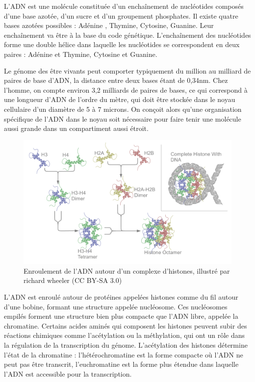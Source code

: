 L'ADN est une molécule constituée d'un enchaînement de nucléotides composés d'une base azotée, d'un sucre et d'un groupement phosphates. Il existe quatre bases azotées possibles : Adénine , Thymine, Cytosine, Guanine. Leur enchaînement va être à la base du code génétique.
L'enchaînement des nucléotides forme une double hélice dans laquelle les nucléotides se correspondent en deux paires : Adénine et Thymine, Cytosine et Guanine. 

Le génome des être vivants peut comporter typiquement du million au milliard de paires de base d'ADN, la distance entre deux bases étant de 0,34nm. Chez l'homme, on compte environ 3,2 milliards de paires de bases, ce qui correspond à une longueur d'ADN de l'ordre du mètre, qui doit être stockée dans le noyau cellulaire d'un diamètre de 5 à 7 microns. 
On conçoit alors qu'une organisation spécifique de l'ADN dans le noyau soit nécessaire pour faire tenir une molécule aussi grande dans un compartiment aussi étroit. 

\begin{figure}[h!]
\includegraphics[scale=0.3]{Nucleosome_structure_by_richard_wheeler}
\caption{Enroulement de l'ADN autour d'un complexe d'histones, illustré par richard wheeler (CC BY-SA 3.0)}
\end{figure}

L'ADN est enroulé autour de protéines appelées histones comme du fil autour d'une bobine, formant une structure appelée nucléosome. Ces nucléosomes empilés forment une structure bien plus compacte que l'ADN libre, appelée la chromatine. Certains acides aminés qui composent les histones peuvent subir des réactions chimiques comme l'acétylation ou la méthylation, qui ont un rôle dans la régulation de la transcription du génome. L'acétylation des histones détermine l'état de la chromatine : l'hétérochromatine est la forme compacte où l'ADN ne peut pas être transcrit, l'euchromatine est la forme plus étendue dans laquelle l'ADN est accessible pour la transcription. 

